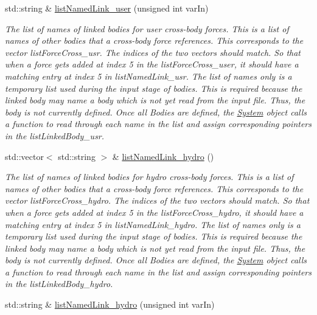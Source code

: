 \begin{DoxyCompactItemize}
std\-::string \& \hyperlink{classosea_1_1ofreq_1_1_body_a1fd7e672b9768351f9a53523d7b5c798}{list\-Named\-Link\-\_\-user} (unsigned int var\-In)
\begin{DoxyCompactList}\small\item\em The list of names of linked bodies for user cross-\/body forces. This is a list of names of other bodies that a cross-\/body force references. This corresponds to the vector list\-Force\-Cross\-\_\-usr. The indices of the two vectors should match. So that when a force gets added at index 5 in the list\-Force\-Cross\-\_\-user, it should have a matching entry at index 5 in list\-Named\-Link\-\_\-usr. The list of names only is a temporary list used during the input stage of bodies. This is required because the linked body may name a body which is not yet read from the input file. Thus, the body is not currently defined. Once all Bodies are defined, the \hyperlink{classosea_1_1ofreq_1_1_system}{System} object calls a function to read through each name in the list and assign corresponding pointers in the list\-Linked\-Body\-\_\-usr. \end{DoxyCompactList}\item 
std\-::vector$<$ std\-::string $>$ \& \hyperlink{classosea_1_1ofreq_1_1_body_abc4abd052a3776123df114c6faf34bae}{list\-Named\-Link\-\_\-hydro} ()
\begin{DoxyCompactList}\small\item\em The list of names of linked bodies for hydro cross-\/body forces. This is a list of names of other bodies that a cross-\/body force references. This corresponds to the vector list\-Force\-Cross\-\_\-hydro. The indices of the two vectors should match. So that when a force gets added at index 5 in the list\-Force\-Cross\-\_\-hydro, it should have a matching entry at index 5 in list\-Named\-Link\-\_\-hydro. The list of names only is a temporary list used during the input stage of bodies. This is required because the linked body may name a body which is not yet read from the input file. Thus, the body is not currently defined. Once all Bodies are defined, the \hyperlink{classosea_1_1ofreq_1_1_system}{System} object calls a function to read through each name in the list and assign corresponding pointers in the list\-Linked\-Body\-\_\-hydro. \end{DoxyCompactList}\item 
std\-::string \& \hyperlink{classosea_1_1ofreq_1_1_body_ad01b96bf575dde9f75f489c7118ca574}{list\-Named\-Link\-\_\-hydro} (unsigned int var\-In)

\end{DoxyCompactItemize}
